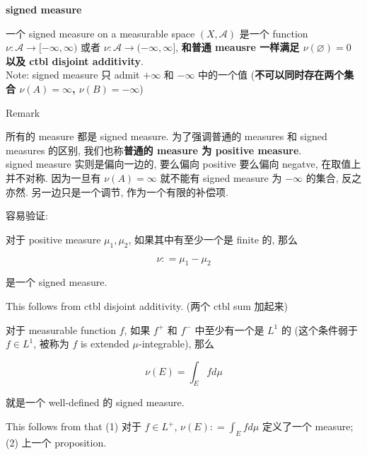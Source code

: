 \documentclass{qlnotes-export}
\begin{document}
\begin{definition}{\protect{}\label{kn-signed-measure}{\textbf{signed
measure}}}

一个 signed measure on a measurable space \((X,\mathcal{A})\) 是一个 function \(\nu:\mathcal{A}\rightarrow\lbrack - \infty,\infty)\) 或者 \(\nu:\mathcal{A}\rightarrow( - \infty,\infty\rbrack\), \textbf{和普通 meausre 一样满足 \(\nu(\varnothing) = 0\) 以及 ctbl disjoint additivity}.\\
Note: signed measure 只 admit \(+ \infty\) 和 \(- \infty\) 中的一个值 (\textbf{不可以同时存在两个集合 \(\nu(A) = \infty\), \(\nu(B) = - \infty\)})

\end{definition}

\begin{qlremark}{Remark}

所有的 measure 都是 signed measure. 为了强调普通的 measures 和 signed measures 的区别, 我们也称\textbf{普通的 measure 为 positive measure}.\\
signed measure 实则是偏向一边的, 要么偏向 positive 要么偏向 negatve, 在取值上并不对称. 因为一旦有 \(\nu(A) = \infty\) 就不能有 signed measure 为 \(- \infty\) 的集合, 反之亦然. 另一边只是一个调节, 作为一个有限的补偿项.

\end{qlremark}

\begin{example}

容易验证:

\begin{proposition}

对于 positive measure \(\mu_{1},\mu_{2}\), 如果其中有至少一个是 finite 的, 那么

\[\nu: = \mu_{1} - \mu_{2}\]

是一个 signed measure.

\end{proposition}

This follows from ctbl disjoint additivity. (两个 ctbl sum 加起来)

\end{example}

\begin{example}

\begin{proposition}

对于 measurable function \(f\), 如果 \(f^{+}\) 和 \(f^{-}\) 中至少有一个是 \(L^{1}\) 的 (这个条件弱于 \(f \in L^{1}\), 被称为 \(f\) is extended \(\mu\)-integrable), 那么

\[\nu(E) = \int_{E}f d\mu\]

就是一个 well-defined 的 signed measure.

\end{proposition}

This follows from that (1) 对于 \(f \in L^{+}\), \(\nu(E): = \int_{E}f d\mu\) 定义了一个 measure; (2) 上一个 proposition.

\end{example}
\end{document}
